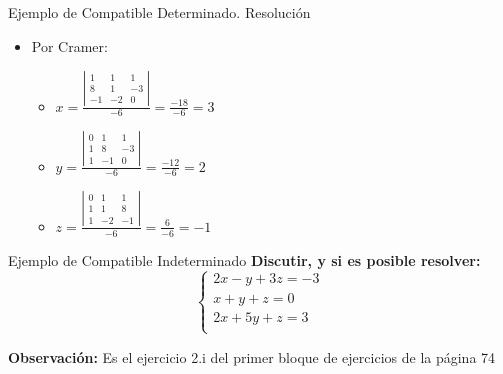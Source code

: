 \documentclass[11pt]{beamer}
\begin{document}
\begin{frame}{Ejemplo de Compatible Determinado. Resolución}

\begin{itemize}[<+->]
    \item Por Cramer: 
    \begin{itemize}[<+->]
        \item $x=\frac{\left|\begin{matrix}1 & 1 & 1\\8 & 1 & -3\\-1 & -2 & 0\end{matrix}\right|}{-6}=\frac{-18}{-6}=3$
        \item $y=\frac{\left|\begin{matrix}0 & 1 & 1\\1 & 8 & -3\\1 & -1 & 0\end{matrix}\right|}{-6}=\frac{-12}{-6}=2$
        \item $z=\frac{\left|\begin{matrix}0 & 1 & 1\\1 & 1 & 8\\1 & -2 & -1\end{matrix}\right|}{-6}=\frac{6}{-6}=-1$
    \end{itemize}
\end{itemize}
\end{frame}

\begin{frame}{Ejemplo de Compatible Indeterminado}
\textbf{    Discutir, y si es posible resolver:\\
$$\left\{ \begin{matrix}2 x - y + 3 z = -3 \\ x + y + z = 0 \\ 2 x + 5 y + z = 3 \\ \end{matrix}\right.$$}

\textbf{Observación:} Es el ejercicio 2.i del primer bloque de ejercicios de la página 74
\end{frame}
\end{document}
